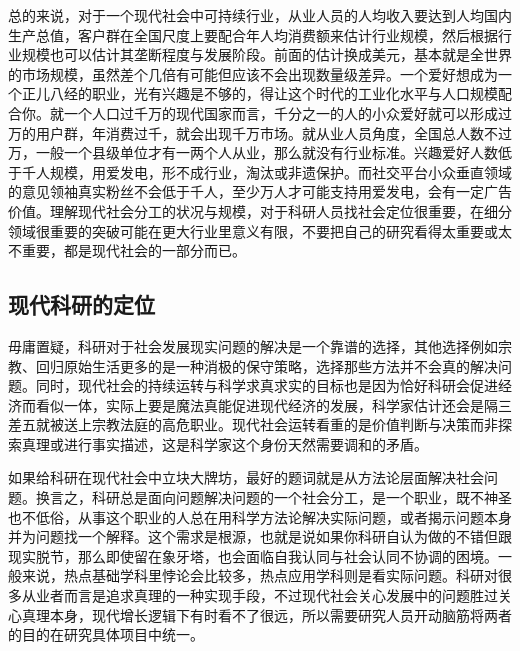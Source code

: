 \documentclass[]{tufte-book}
\begin{document}
总的来说，对于一个现代社会中可持续行业，从业人员的人均收入要达到人均国内生产总值，客户群在全国尺度上要配合年人均消费额来估计行业规模，然后根据行业规模也可以估计其垄断程度与发展阶段。前面的估计换成美元，基本就是全世界的市场规模，虽然差个几倍有可能但应该不会出现数量级差异。一个爱好想成为一个正儿八经的职业，光有兴趣是不够的，得让这个时代的工业化水平与人口规模配合你。就一个人口过千万的现代国家而言，千分之一的人的小众爱好就可以形成过万的用户群，年消费过千，就会出现千万市场。就从业人员角度，全国总人数不过万，一般一个县级单位才有一两个人从业，那么就没有行业标准。兴趣爱好人数低于千人规模，用爱发电，形不成行业，淘汰或非遗保护。而社交平台小众垂直领域的意见领袖真实粉丝不会低于千人，至少万人才可能支持用爱发电，会有一定广告价值。理解现代社会分工的状况与规模，对于科研人员找社会定位很重要，在细分领域很重要的突破可能在更大行业里意义有限，不要把自己的研究看得太重要或太不重要，都是现代社会的一部分而已。

\hypertarget{ux73b0ux4ee3ux79d1ux7814ux7684ux5b9aux4f4d}{%
\subsection{现代科研的定位}\label{ux73b0ux4ee3ux79d1ux7814ux7684ux5b9aux4f4d}}

毋庸置疑，科研对于社会发展现实问题的解决是一个靠谱的选择，其他选择例如宗教、回归原始生活更多的是一种消极的保守策略，选择那些方法并不会真的解决问题。同时，现代社会的持续运转与科学求真求实的目标也是因为恰好科研会促进经济而看似一体，实际上要是魔法真能促进现代经济的发展，科学家估计还会是隔三差五就被送上宗教法庭的高危职业。现代社会运转看重的是价值判断与决策而非探索真理或进行事实描述，这是科学家这个身份天然需要调和的矛盾。

如果给科研在现代社会中立块大牌坊，最好的题词就是从方法论层面解决社会问题。换言之，科研总是面向问题解决问题的一个社会分工，是一个职业，既不神圣也不低俗，从事这个职业的人总在用科学方法论解决实际问题，或者揭示问题本身并为问题找一个解释。这个需求是根源，也就是说如果你科研自认为做的不错但跟现实脱节，那么即使留在象牙塔，也会面临自我认同与社会认同不协调的困境。一般来说，热点基础学科里悖论会比较多，热点应用学科则是看实际问题。科研对很多从业者而言是追求真理的一种实现手段，不过现代社会关心发展中的问题胜过关心真理本身，现代增长逻辑下有时看不了很远，所以需要研究人员开动脑筋将两者的目的在研究具体项目中统一。
\end{document}
